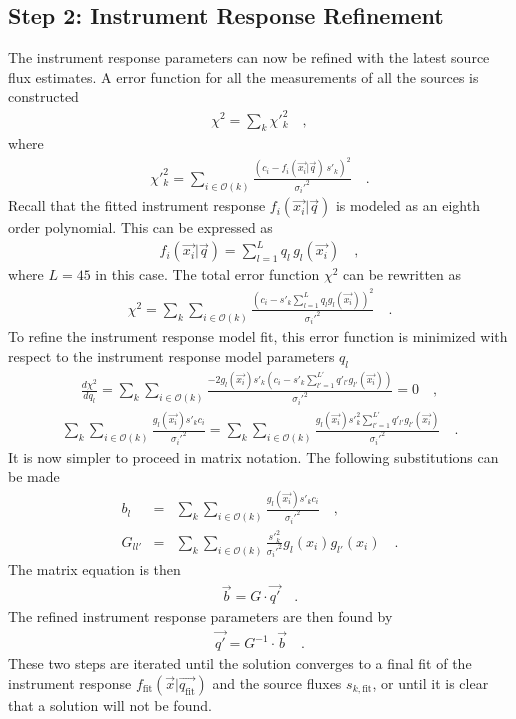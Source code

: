 \documentclass[preprint,pdftex]{aastex}
\newcommand{\fit}{\text{fit}}
\begin{document}
\subsection{Step 2: Instrument Response Refinement}
The instrument response parameters can now be refined with the latest source flux estimates. A error function for all the measurements of all the sources is constructed
\begin{eqnarray*}
\chi^2 = \sum_{k} \chi'^2_k \quad ,
\end{eqnarray*}
where
\begin{eqnarray*}
\chi'^2_k = \sum_{i \in \mathcal{O}(k)} \frac{(c_i-f_{i}(\vec{x_i} | \vec{q}) \, s'_{k})^2}{{\sigma_i'}^2}  \quad .
\end{eqnarray*}
Recall that the fitted instrument response $f_{i}(\vec{x_i} | \vec{q})$ is modeled as an eighth order polynomial. This can be expressed as
\begin{eqnarray*}
f_{i}(\vec{x_i} | \vec{q}) = \sum_{l = 1}^L q_{l} \, g_l(\vec{x_i})  \quad ,
\end{eqnarray*}
where $L = 45$ in this case. The total error function $\chi^2$ can be rewritten as
\begin{eqnarray*}
\chi^2 =\sum_{k} \sum_{i \in \mathcal{O}(k)} \frac{(c_i- s'_{k} \sum_{l = 1}^L q_{l} g_l(\vec{x_i}))^2}{{\sigma_i'}^2}   \quad .
\end{eqnarray*}
To refine the instrument response model fit, this error function is minimized with respect to the instrument response model parameters $q_{l}$
\begin{eqnarray*}
\frac{d\chi^2}{dq_{l}} = \sum_{k} \sum_{i \in \mathcal{O}(k)} \frac{-2 g_l(\vec{x_i}) s'_{k} (c_i- s'_{k} \sum_{l' = 1}^{L'} q'_{l'} g_{l'}(\vec{x_i}))}{{\sigma_i'}^2} = 0  \quad ,
\end{eqnarray*}
\begin{eqnarray*}
\sum_{k} \sum_{i \in \mathcal{O}(k)} \frac{g_l(\vec{x_i}) s'_{k} c_i}{{\sigma_i'}^2} = \sum_{k} \sum_{i \in \mathcal{O}(k)} \frac{g_l (\vec{x_i}) s'^2_{k} \sum_{l' = 1}^{L'} q'_{l'} g_{l'} (\vec{x_i})} {{\sigma_i'}^2}   \quad .
\end{eqnarray*}
It is now simpler to proceed in matrix notation. The following substitutions can be made
\begin{eqnarray}
b_l & = & \sum_{k} \sum_{i \in \mathcal{O}(k)} \frac{g_l(\vec{x_i}) s'_{k} c_i}{\sigma_i'^2}    \quad ,\\
G_{ll'} & = & \sum_{k} \sum_{i \in \mathcal{O}(k)} \frac{{s'}_{k}^2}{\sigma_i'^2} g_l(x_i) g_{l'}(x_i)   \quad .
\end{eqnarray}
The matrix equation is then
\begin{eqnarray*}
\vec{b} = G \cdot \vec{q'}    \quad .
\end{eqnarray*}
The refined instrument response parameters are then found by
\begin{eqnarray*}
\vec{q'} = G^{-1}  \cdot \vec{b}   \quad .
\end{eqnarray*}
These two steps are iterated until the solution converges to a final fit of the instrument response $f_\fit(\vec{x} | \vec{q_\fit})$ and the source fluxes $s_{k,\fit}$, or until it is clear that a solution will not be found. 
\end{document}
